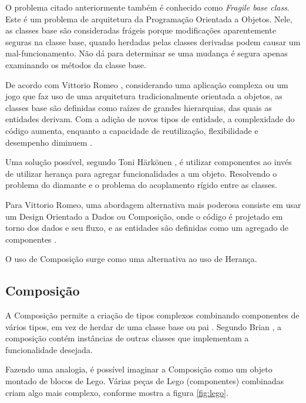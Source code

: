 O problema citado anteriormente também é conhecido como \textit{Fragile base class}. Este é um problema de arquitetura da Programação Orientada a Objetos. Nele, as classes base são consideradas frágeis porque modificações aparentemente seguras na classe base, quando herdadas pelas classes derivadas podem causar um mal-funcionamento. Não dá para determinar se uma mudança é segura apenas examinando os métodos da classe base.


De acordo com Vittorio Romeo \cite{multiEcs}, considerando uma aplicação complexa ou um jogo que faz uso de uma arquitetura tradicionalmente orientada a objetos, as classes base são definidas como raízes de grandes hierarquias, das quais as entidades derivam. Com a adição de novos tipos de entidade, a complexidade do código aumenta, enquanto a capacidade de reutilização, flexibilidade e desempenho diminuem \cite{multiEcs}. 

Uma solução possível, segundo Toni Härkönen \cite{advantagesEcs}, é utilizar componentes ao invés de utilizar herança para agregar funcionalidades a um objeto. Resolvendo o problema do diamante e o problema do acoplamento rígido entre as classes.

Para Vittorio Romeo, uma abordagem alternativa mais poderosa consiste em usar um Design Orientado a Dados ou Composição, onde o código é projetado em torno dos dados e seu fluxo, e as entidades são definidas como um agregado de componentes \cite{multiEcs}.

O uso de Composição surge como uma alternativa ao uso de Herança.

\subsection{Composição}
A Composição permite a criação de tipos complexos combinando componentes de vários tipos, em vez de herdar de uma classe base ou pai \cite{composition}. Segundo Brian \cite{composition}, a composição contém instâncias de outras classes que implementam a funcionalidade desejada.

Fazendo uma analogia, é possível imaginar a Composição como um objeto montado de blocos de Lego. Várias peças de Lego (componentes) combinadas criam algo mais complexo, conforme mostra a figura \ref{fig:lego}. 

